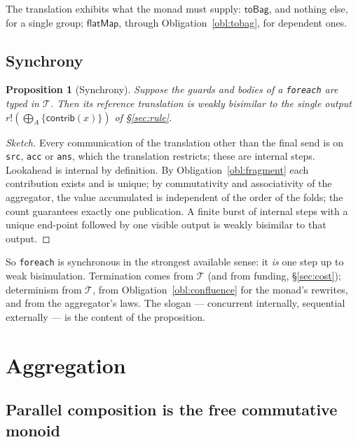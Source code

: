 \documentclass[11pt]{article}
\theoremstyle{branddef}
\theoremstyle{brandplain}
\newtheorem{proposition}[definition]{Proposition}
\theoremstyle{brandrem}
\newcommand{\bind}{\mathsf{flatMap}}
\newcommand{\fe}{\texttt{foreach}}
\begin{document}
The translation exhibits what the monad must supply: \(\mathsf{toBag}\), and
nothing else, for a single group; \(\bind\), through Obligation~\ref{obl:tobag},
for dependent ones.

\subsection{Synchrony}
\label{sec:sync}

\begin{proposition}[Synchrony]
\label{prop:sync}
Suppose the guards and bodies of a \fe{} are typed in \(\mathcal{T}\). Then its
reference translation is weakly bisimilar to the single output
\(r!(\bigoplus_A\{\mathsf{contrib}(x)\})\) of \S\ref{sec:rule}.
\end{proposition}

\begin{proof}[Sketch]
Every communication of the translation other than the final send is on
\texttt{src}, \texttt{acc} or \texttt{ans}, which the translation restricts;
these are internal steps. Lookahead is internal by definition. By
Obligation~\ref{obl:fragment} each contribution exists and is unique; by
commutativity and associativity of the aggregator, the value accumulated is
independent of the order of the folds; the count guarantees exactly one
publication. A finite burst of internal steps with a unique end-point followed
by one visible output is weakly bisimilar to that output.
\end{proof}

So \fe{} is synchronous in the strongest available sense: it \emph{is} one step
up to weak bisimulation. Termination comes from \(\mathcal{T}\) (and from
funding, \S\ref{sec:cost}); determinism from \(\mathcal{T}\), from
Obligation~\ref{obl:confluence} for the monad's rewrites, and from the
aggregator's laws. The slogan --- concurrent internally, sequential externally
--- is the content of the proposition.

\section{Aggregation}
\label{sec:agg}

\subsection{Parallel composition is the free commutative monoid}
\label{sec:free}
\end{document}
